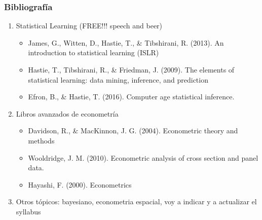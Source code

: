 \documentclass[
  shownotes,
  xcolor={svgnames},
  hyperref={colorlinks,citecolor=DarkBlue,linkcolor=DarkRed,urlcolor=DarkBlue}
  ]{beamer}
\begin{document}
\begin{frame}
\frametitle{Bibliografía}


\begin{enumerate}
  \item Statistical Learning (FREE!!! speech and beer)
  \begin{itemize}
    \small
    \item James, G., Witten, D., Hastie, T., \& Tibshirani, R. (2013). An introduction to statistical learning (ISLR)
    \item Hastie, T., Tibshirani, R., \& Friedman, J. (2009). The elements of statistical learning: data mining, inference, and prediction
    \item Efron, B., \& Hastie, T. (2016). Computer age statistical inference.
  \end{itemize}
  \bigskip
  \item Libros avanzados de econometría
  \begin{itemize}
    \small
    \item Davidson, R., \& MacKinnon, J. G. (2004). Econometric theory and methods 
    \item Wooldridge, J. M. (2010). Econometric analysis of cross section and panel data. 
    \item Hayashi, F. (2000). Econometrics
  \end{itemize}
\bigskip
  \item Otros tópicos: bayesiano, econometria espacial, voy a indicar y a actualizar el syllabus
  \end{enumerate}





\end{frame}
\end{document}
